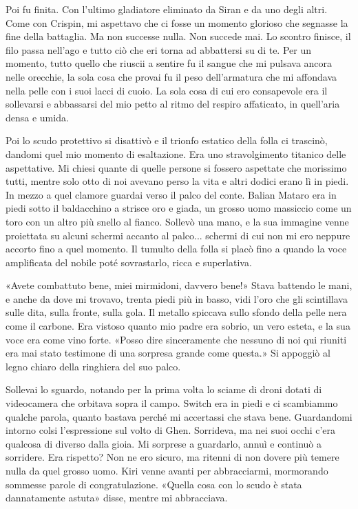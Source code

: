 Poi fu finita. Con l'ultimo gladiatore eliminato da Siran e da uno degli
altri. Come con Crispin, mi aspettavo che ci fosse un momento glorioso
che segnasse la fine della battaglia. Ma non successe nulla. Non succede
mai. Lo scontro finisce, il filo passa nell'ago e tutto ciò che eri
torna ad abbattersi su di te. Per un momento, tutto quello che riuscii a
sentire fu il sangue che mi pulsava ancora nelle orecchie, la sola cosa
che provai fu il peso dell'armatura che mi affondava nella pelle con i
suoi lacci di cuoio. La sola cosa di cui ero consapevole era il
sollevarsi e abbassarsi del mio petto al ritmo del respiro affaticato,
in quell'aria densa e umida.

Poi lo scudo protettivo si disattivò e il trionfo estatico della folla
ci trascinò, dandomi quel mio momento di esaltazione. Era uno
stravolgimento titanico delle aspettative. Mi chiesi quante di quelle
persone si fossero aspettate che morissimo tutti, mentre solo otto di
noi avevano perso la vita e altri dodici erano lì in piedi. In mezzo a
quel clamore guardai verso il palco del conte. Balian Mataro era in
piedi sotto il baldacchino a strisce oro e giada, un grosso uomo
massiccio come un toro con un altro più snello al fianco. Sollevò una
mano, e la sua immagine venne proiettata su alcuni schermi accanto al
palco... schermi di cui non mi ero neppure accorto fino a quel momento.
Il tumulto della folla si placò fino a quando la voce amplificata del
nobile poté sovrastarlo, ricca e superlativa.

«Avete combattuto bene, miei mirmidoni, davvero bene!» Stava battendo le
mani, e anche da dove mi trovavo, trenta piedi più in basso, vidi l'oro
che gli scintillava sulle dita, sulla fronte, sulla gola. Il metallo
spiccava sullo sfondo della pelle nera come il carbone. Era vistoso
quanto mio padre era sobrio, un vero esteta, e la sua voce era come vino
forte. «Posso dire sinceramente che nessuno di noi qui riuniti era mai
stato testimone di una sorpresa grande come questa.» Si appoggiò al
legno chiaro della ringhiera del suo palco.

Sollevai lo sguardo, notando per la prima volta lo sciame di droni
dotati di videocamera che orbitava sopra il campo. Switch era in piedi e
ci scambiammo qualche parola, quanto bastava perché mi accertassi che
stava bene. Guardandomi intorno colsi l'espressione sul volto di Ghen.
Sorrideva, ma nei suoi occhi c'era qualcosa di diverso dalla gioia. Mi
sorprese a guardarlo, annuì e continuò a sorridere. Era rispetto? Non ne
ero sicuro, ma ritenni di non dovere più temere nulla da quel grosso
uomo. Kiri venne avanti per abbracciarmi, mormorando sommesse parole di
congratulazione. «Quella cosa con lo scudo è stata dannatamente astuta»
disse, mentre mi abbracciava.

